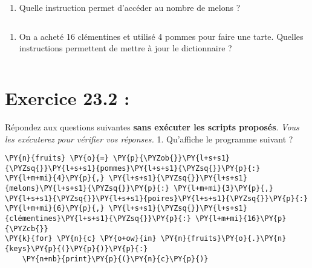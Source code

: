 \documentclass[12pt]{book}
\begin{document}
    \begin{enumerate}
\def\labelenumi{\arabic{enumi}.}
\tightlist
\item
  Quelle instruction permet d'accéder au nombre de melons ?
\end{enumerate}

    \begin{tcolorbox}[breakable, size=fbox, boxrule=1pt, pad at break*=1mm,colback=cellbackground, colframe=cellborder]
\begin{Verbatim}[commandchars=\\\{\}]

\end{Verbatim}
\end{tcolorbox}

    \begin{enumerate}
\def\labelenumi{\arabic{enumi}.}
\setcounter{enumi}{1}
\tightlist
\item
  On a acheté 16 clémentines et utilisé 4 pommes pour faire une tarte.
  Quelles instructions permettent de mettre à jour le dictionnaire ?
\end{enumerate}

    \begin{tcolorbox}[breakable, size=fbox, boxrule=1pt, pad at break*=1mm,colback=cellbackground, colframe=cellborder]
\begin{Verbatim}[commandchars=\\\{\}]

\end{Verbatim}
\end{tcolorbox}

    \hypertarget{exercice-23.2}{%
\section{Exercice 23.2 :}\label{exercice-23.2}}

Répondez aux questions suivantes \textbf{sans exécuter les scripts
proposés}. \emph{Vous les exécuterez pour vérifier vos réponses.} 1.
Qu'affiche le programme suivant ?

    \begin{tcolorbox}[breakable, size=fbox, boxrule=1pt, pad at break*=1mm,colback=cellbackground, colframe=cellborder]
\begin{Verbatim}[commandchars=\\\{\}]
\PY{n}{fruits} \PY{o}{=} \PY{p}{\PYZob{}}\PY{l+s+s1}{\PYZsq{}}\PY{l+s+s1}{pommes}\PY{l+s+s1}{\PYZsq{}}\PY{p}{:} \PY{l+m+mi}{4}\PY{p}{,} \PY{l+s+s1}{\PYZsq{}}\PY{l+s+s1}{melons}\PY{l+s+s1}{\PYZsq{}}\PY{p}{:} \PY{l+m+mi}{3}\PY{p}{,} \PY{l+s+s1}{\PYZsq{}}\PY{l+s+s1}{poires}\PY{l+s+s1}{\PYZsq{}}\PY{p}{:} \PY{l+m+mi}{6}\PY{p}{,} \PY{l+s+s1}{\PYZsq{}}\PY{l+s+s1}{clémentines}\PY{l+s+s1}{\PYZsq{}}\PY{p}{:} \PY{l+m+mi}{16}\PY{p}{\PYZcb{}}
\PY{k}{for} \PY{n}{c} \PY{o+ow}{in} \PY{n}{fruits}\PY{o}{.}\PY{n}{keys}\PY{p}{(}\PY{p}{)}\PY{p}{:}
    \PY{n+nb}{print}\PY{p}{(}\PY{n}{c}\PY{p}{)}
\end{Verbatim}
\end{tcolorbox}
\end{document}
